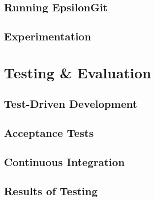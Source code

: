 \documentclass[11pt]{book}
\begin{document}
\section{Running EpsilonGit}

\section{Experimentation}


\chapter{Testing \& Evaluation}
\label{testeval}
\section{Test-Driven Development}
\section{Acceptance Tests}
\section{Continuous Integration}
\section{Results of Testing}
\end{document}
